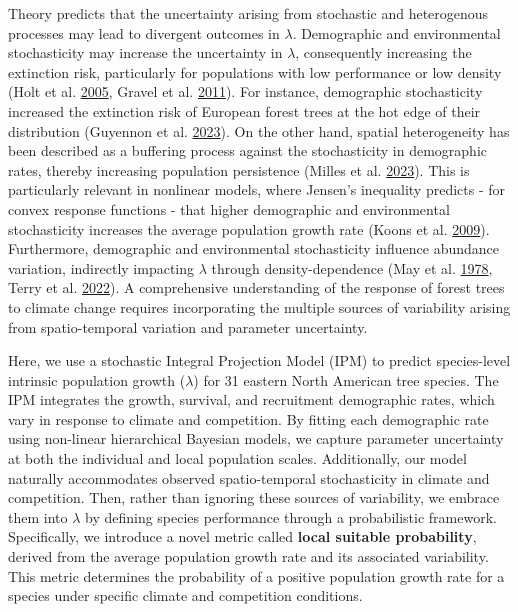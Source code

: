 \documentclass[12pt]{article}
\begin{document}
Theory predicts that the uncertainty arising from stochastic and
heterogenous processes may lead to divergent outcomes in \(\lambda\).
Demographic and environmental stochasticity may increase the uncertainty
in \(\lambda\), consequently increasing the extinction risk,
particularly for populations with low performance or low density (Holt
et al. \protect\hyperlink{ref-Holt2005}{2005}, Gravel et al.
\protect\hyperlink{ref-Gravel2011}{2011}). For instance, demographic
stochasticity increased the extinction risk of European forest trees at
the hot edge of their distribution (Guyennon et al.
\protect\hyperlink{ref-Guyennon2023}{2023}). On the other hand, spatial
heterogeneity has been described as a buffering process against the
stochasticity in demographic rates, thereby increasing population
persistence (Milles et al. \protect\hyperlink{ref-milles2023}{2023}).
This is particularly relevant in nonlinear models, where Jensen's
inequality predicts - for convex response functions - that higher
demographic and environmental stochasticity increases the average
population growth rate (Koons et al.
\protect\hyperlink{ref-Koons2009}{2009}). Furthermore, demographic and
environmental stochasticity influence abundance variation, indirectly
impacting \(\lambda\) through density-dependence (May et al.
\protect\hyperlink{ref-May1978}{1978}, Terry et al.
\protect\hyperlink{ref-Terry2022}{2022}). A comprehensive understanding
of the response of forest trees to climate change requires incorporating
the multiple sources of variability arising from spatio-temporal
variation and parameter uncertainty.

Here, we use a stochastic Integral Projection Model (IPM) to predict
species-level intrinsic population growth (\(\lambda\)) for 31 eastern
North American tree species. The IPM integrates the growth, survival,
and recruitment demographic rates, which vary in response to climate and
competition. By fitting each demographic rate using non-linear
hierarchical Bayesian models, we capture parameter uncertainty at both
the individual and local population scales. Additionally, our model
naturally accommodates observed spatio-temporal stochasticity in climate
and competition. Then, rather than ignoring these sources of
variability, we embrace them into \(\lambda\) by defining species
performance through a probabilistic framework. Specifically, we
introduce a novel metric called \textbf{local suitable probability},
derived from the average population growth rate and its associated
variability. This metric determines the probability of a positive
population growth rate for a species under specific climate and
competition conditions.
\end{document}
